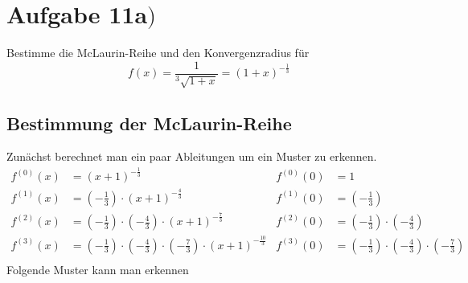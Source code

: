 \documentclass[18pt,a4paper]{article}
\begin{document}
\section*{Aufgabe 11a$)$}
Bestimme die McLaurin-Reihe und den Konvergenzradius für
\begin{equation*}
f(x) = \frac{1}{^3\sqrt{1+x}} = (1+x)^{-\frac{1}{3}}
\end{equation*}
\subsection*{Bestimmung der McLaurin-Reihe}
Zunächst berechnet man ein paar Ableitungen um ein Muster zu erkennen.
\begin{align*}
f^{(0)}(x) &=  (x+1)^{-\frac{1}{3}}  &f^{(0)}(0) &=  1\\
f^{(1)}(x) &=  (-\frac{1}{3})\cdot (x+1)^{-\frac{4}{3}}  &f^{(1)}(0) &=  (-\frac{1}{3}) \\
f^{(2)}(x) &=  (-\frac{1}{3})\cdot(-\frac{4}{3})\cdot (x+1)^{-\frac{7}{3}}   &f^{(2)}(0) &= (-\frac{1}{3})\cdot(-\frac{4}{3}) \\
f^{(3)}(x) &=  (-\frac{1}{3})\cdot(-\frac{4}{3})\cdot(-\frac{7}{3})\cdot (x+1)^{-\frac{10}{3}}  &f^{(3)}(0) &= (-\frac{1}{3})\cdot(-\frac{4}{3})\cdot(-\frac{7}{3}) \\
\end{align*}
Folgende Muster kann man erkennen
\begin{comment}
Hier ist nun zu sehen, dass für eine gerade Ableitung das Ergebnis postiv ist und für ungerade Ableitungen negativ. Weiterhin wird in der n-ten Ableitung mit n Brüchen multipliziert bei denen der Nenner jeweils 3 ist und in den Zählern die Folge: (1+3(n-1)). Mit diesen Eigenschaften ist es möglich ein allgemeines Produkt für die Werte an der Stelle eins zu berechnen.
\end{comment}
\end{document}
